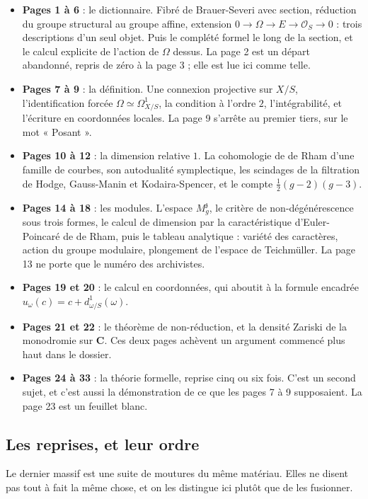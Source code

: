 \documentclass[11pt,a4paper]{article}
\begin{document}
\begin{itemize}
\item \textbf{Pages 1 à 6} : le dictionnaire. Fibré de Brauer-Severi avec
section, réduction du groupe structural au groupe affine, extension
$0 \to \Omega \to E \to \mathcal{O}_S \to 0$ : trois descriptions d'un seul
objet. Puis le complété formel le long de la section, et le calcul explicite
de l'action de $\Omega$ dessus. La page 2 est un départ abandonné, repris de
zéro à la page 3 ; elle est lue ici comme telle.
\item \textbf{Pages 7 à 9} : la définition. Une connexion projective sur
$X/S$, l'identification forcée $\Omega \simeq \Omega^1_{X/S}$, la condition à
l'ordre $2$, l'intégrabilité, et l'écriture en coordonnées locales. La
page 9 s'arrête au premier tiers, sur le mot « Posant ».
\item \textbf{Pages 10 à 12} : la dimension relative $1$. La cohomologie de
de Rham d'une famille de courbes, son autodualité symplectique, les
scindages de la filtration de Hodge, Gauss-Manin et Kodaira-Spencer, et le
compte $\tfrac12(g-2)(g-3)$.
\item \textbf{Pages 14 à 18} : les modules. L'espace $M_g^{\mathfrak{z}}$, le
critère de non-dégénérescence sous trois formes, le calcul de dimension par
la caractéristique d'Euler-Poincaré de de Rham, puis le tableau analytique :
variété des caractères, action du groupe modulaire, plongement de l'espace de
Teichmüller. La page 13 ne porte que le numéro des archivistes.
\item \textbf{Pages 19 et 20} : le calcul en coordonnées, qui aboutit à la
formule encadrée $u_\omega(c) = c + d^1_{\omega/S}(\omega)$.
\item \textbf{Pages 21 et 22} : le théorème de non-réduction, et la densité
Zariski de la monodromie sur $\mathbf{C}$. Ces deux pages achèvent un
argument commencé plus haut dans le dossier.
\item \textbf{Pages 24 à 33} : la théorie formelle, reprise cinq ou six fois.
C'est un second sujet, et c'est aussi la démonstration de ce que les pages 7
à 9 supposaient. La page 23 est un feuillet blanc.
\end{itemize}

\subsection*{Les reprises, et leur ordre}

Le dernier massif est une suite de moutures du même
matériau. Elles ne disent pas tout à fait la même chose, et on les distingue
ici plutôt que de les fusionner.
\end{document}
